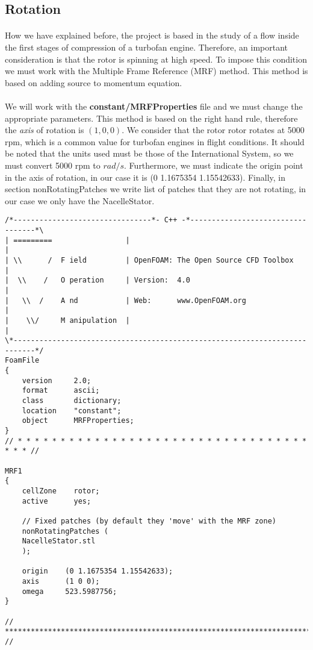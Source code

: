 \subsection{Rotation}
\paragraph{}
How we have explained before, the project is based in the study of a flow inside the first stages of compression of a turbofan engine. Therefore, an important consideration is that the rotor is spinning at high speed. To impose this condition we must work with the Multiple Frame Reference (MRF) method. This method is based on adding source to momentum equation.

\paragraph{}
We will work with the \textbf{constant/MRFProperties} file and we must change the appropriate parameters. This method is based on the right hand rule, therefore the \textit{axis} of rotation is $(1,0,0)$. We consider that the rotor rotor rotates at 5000 rpm, which is a common value for turbofan engines in flight conditions. It should be noted that the units used must be those of the International System, so we must convert 5000 rpm to $rad/s $. Furthermore, we must indicate the origin point in the axis of rotation, in our case it is (0 1.1675354 1.15542633). Finally, in section nonRotatingPatches we write list of patches that they are not rotating, in our case we only have the NacelleStator.


\begin{footnotesize}
\begin{verbatim}
/*--------------------------------*- C++ -*----------------------------------*\
| =========                 |                                                 |
| \\      /  F ield         | OpenFOAM: The Open Source CFD Toolbox           |
|  \\    /   O peration     | Version:  4.0                                   |
|   \\  /    A nd           | Web:      www.OpenFOAM.org                      |
|    \\/     M anipulation  |                                                 |
\*---------------------------------------------------------------------------*/
FoamFile
{
    version     2.0;
    format      ascii;
    class       dictionary;
    location    "constant";
    object      MRFProperties;
}
// * * * * * * * * * * * * * * * * * * * * * * * * * * * * * * * * * * * * * //

MRF1
{
    cellZone    rotor;
    active      yes;

    // Fixed patches (by default they 'move' with the MRF zone)
    nonRotatingPatches (
	NacelleStator.stl
	);

    origin    (0 1.1675354 1.15542633);
    axis      (1 0 0);
    omega     523.5987756;
}

// ************************************************************************* //
\end{verbatim}
\end{footnotesize}

